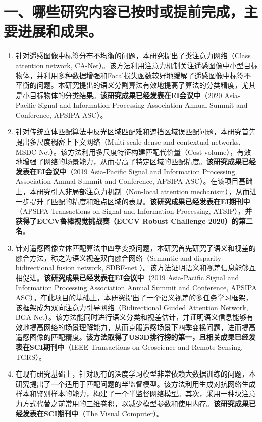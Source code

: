 \documentclass{article}
\begin{document}
\section*{一、哪些研究内容已按时或提前完成，主要进展和成果。}
\begin{enumerate}
\item 针对遥感图像中标签分布不均衡的问题，本研究提出了类注意力网络（Class attention network, CA-Net）。该方法利用注意力机制关注遥感图像中小型目标物体，并利用多种数据增强和Focal损失函数较好地缓解了遥感图像中标签不平衡的问题。本研究提出的语义分割算法有效地提高了算法的分类精度，尤其是小目标物体的分类结果。\textbf{该研究成果已经发表在EI会议中}\cite{Rao2020Class}（2020 Asia-Pacific Signal and Information Processing Association Annual Summit and Conference, APSIPA ASC）。
\item 针对传统立体匹配算法中反光区域匹配难和遮挡区域误匹配问题，本研究首先提出多尺度稠密上下文网络（Multi-scale dense and contextual networks, MSDC-Net）。该方法利用多尺度特征构建匹配代价量（Cost volume），有效地增强了网络的场景能力，从而提高了特定区域的匹配精度。\textbf{该研究成果已经发表在EI会议中}\cite{Rao2019Msdc}（2019 Asia-Pacific Signal and Information Processing Association Annual Summit and Conference, APSIPA ASC）。在该项目基础上，本研究引入非局部注意力机制（Non-local attention mechanism），从而进一步提升了匹配的精度和难点区域的表现。\textbf{该研究成果已经发表在EI期刊中}\cite{Rao2020Nlca}（APSIPA Transactions on Signal and Information Processing, ATSIP），\textbf{并获得了ECCV鲁棒视觉挑战赛（ECCV Robust Challenge 2020）的第二名}。
\item 针对遥感图像立体匹配算法中四季变换问题，本研究首先研究了语义和视差的融合方法，称之为语义视差双向融合网络（Semantic and disparity bidirectional fusion network, SDBF-net ）。该方法证明语义和视差信息能够互相促进。\textbf{该研究成果已经发表在EI会议中}\cite{Rao2019Sdbf}（2019 Asia-Pacific Signal and Information Processing Association Annual Summit and Conference, APSIPA ASC）。在此项目的基础上，本研究提出了一个语义视差的多任务学习框架，该框架成为双向注意力引导网络（Bidirectional Guided Attention Network, BGA-Net）。该方法能同时进行语义分类和视差估计，并证明语义信息能够有效地提高网络的场景理解能力，从而克服遥感场景下四季变换问题，进而提高遥感图像的匹配精度。\textbf{该方法取得了US3D排行榜的第一，且相关成果已经发表在SCI期刊中}\cite{Rao2020BiDirectional}（IEEE Transactions on Geoscience and Remote Sensing, TGRS）。
\item 在现有研究基础上，针对现有的深度学习模型非常依赖大数据训练的问题，本研究提出了一个适用于匹配问题的半监督模型。该方法利用生成对抗网络生成样本和鉴别样本的能力，构建了一个半监督网络模型。其次，采用一种块注意力方式代替之前常用的三维卷积，以减少模型参数和使用内存。\textbf{该研究成果已经发表在SCI期刊中}\cite{Rao2020Patch}（The Visual Computer）。
\end{enumerate}
\end{document}
